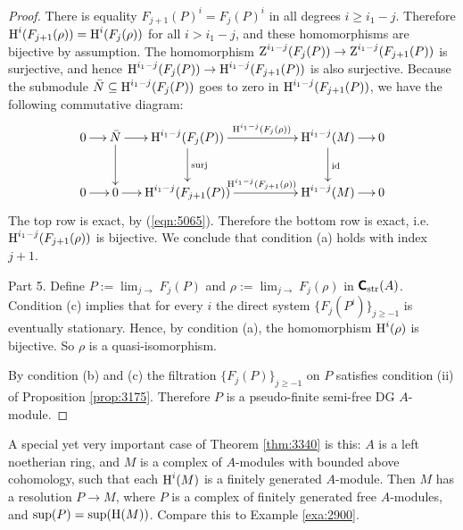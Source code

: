\begin{proof}
There is equality $F_{j + 1}(P)^i = F_{j}(P)^i$
in all degrees $i \geq i_1 - j$.
Therefore  
$\operatorname{H}^i(F_{j + 1}(\rho)) = \operatorname{H}^i(F_j(\rho))$
for all $i > i_1 - j$, and these homomorphisms are bijective by assumption. 
The homomorphism 
$\operatorname{Z}^{i_1 - j}(F_{j}(P)) \to \operatorname{Z}^{i_1 - j}(F_{j + 1}(P))$
is surjective, and hence 
$\operatorname{H}^{i_1 - j}(F_{j}(P)) \to \operatorname{H}^{i_1 - j}(F_{j + 1}(P))$
is also surjective. Because 
the submodule $\bar{N} \subseteq \operatorname{H}^{i_1 - j}(F_j(P))$
goes to zero in $\operatorname{H}^{i_1 - j}(F_{j + 1}(P))$,
we have the following commutative diagram:
\[ \UseTips \xymatrix @C=3ex @R=6ex {
0
\ar[r]
&
\bar{N}
\ar[r]
\ar[d]
&
\opn{H}^{i_1 - j}(F_{j}(P))
\ar[rrr]^(0.53){\opn{H}^{i_1 - j}(F_{j}(\rho))}
\ar[d]^{\mrm{surj}}
& & &
\opn{H}^{i_1 - j}(M)
\ar[r]
\ar[d]^{\opn{id}}
&
0
\\
0
\ar[r]
&
0
\ar[r]
&
\opn{H}^{i_1 - j}(F_{j + 1}(P))
\ar[rrr]^(0.53){\opn{H}^{i_1 - j}(F_{j + 1}(\rho))}
& & &
\opn{H}^{i_1 - j}(M)
\ar[r]
&
0
} \]
The top row is exact, by (\ref{eqn:5065}). Therefore the bottom row is exact, 
i.e.\ \lb $\operatorname{H}^{i_1 - j}(F_{j + 1}(\rho))$ is bijective.
We conclude that condition (a) holds with index $j + 1$. 

\medskip \noindent
Part 5. Define 
$P := \lim_{j \to} F_{j}(P)$ and 
$\rho := \lim_{j \to} F_{j}(\rho)$
in $\boldsymbol{\mathsf{C}}_{\mathrm{str}}(A)$. 
Condition (c) implies that for every $i$ the direct system $\{ F_j(P^i) \}_{j 
\geq -1}$ is eventually stationary. Hence, by condition (a), the homomorphism 
$\operatorname{H}^i(\rho)$ is bijective. So $\rho$ is a quasi-isomorphism. 

By condition (b) and (c) the filtration $\{ F_j(P) \}_{j \geq -1}$
on $P$ satisfies condition (ii) of Proposition \ref{prop:3175}. Therefore $P$ 
is a pseudo-finite semi-free DG $A$-module.
\end{proof}

\begin{exa} \label{exa:1930} 
A special yet very important case of Theorem \ref{thm:3340} is this: 
$A$ is a left noetherian ring, and $M$ is a complex of $A$-modules 
with bounded above cohomology, such that each $\operatorname{H}^i(M)$ is a finitely 
generated $A$-module. Then $M$ has a resolution 
$P \to M$, where $P$ is a complex of finitely generated free $A$-modules, and 
$\operatorname{sup}(P) = \operatorname{sup}(\operatorname{H}(M))$. 
Compare this to Example \ref{exa:2900}.
\end{exa}

